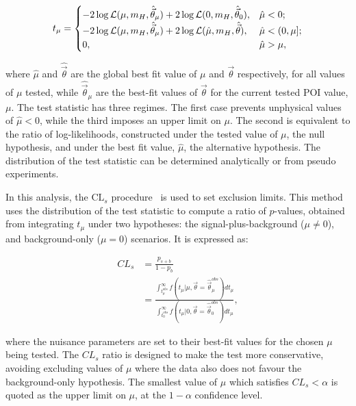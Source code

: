 \begin{equation}\label{eqn:hee_test_stat}
     t_{\mu} =
    \begin{cases}
      -2\log\mathcal{L}(\mu,m_{H},\hat{\vec{\theta}}_{\mu}) + 2\log\mathcal{L}(0,m_{H},\hat{\vec{\theta}}_{0}), & \hat{\mu}<0;\\
      -2\log\mathcal{L}(\mu,m_{H},\hat{\vec{\theta}}_{\mu}) + 2\log\mathcal{L}(\hat{\mu},m_{H},\hat{\vec{\theta}}), & \hat{\mu}<(0,\mu];\\
      0, & \hat{\mu}>\mu,\\
    \end{cases} 
\end{equation}


\noindent where $\hat{\mu}$ and $\hat{\vec{\theta}}$ are the global best fit value of $\mu$ and ${\vec{\theta}}$ respectively, for all values of $\mu$ tested, while $\hat{\vec{\theta}}_{\mu}$ are the best-fit values of $\vec{\theta}$ for the current tested POI value, $\mu$. The test statistic has three regimes. The first case prevents unphysical values of $\hat{\mu}<0$, while the third imposes an upper limit on $\mu$. The second is equivalent to the ratio of log-likelihoods, constructed under the tested value of $\mu$, the null hypothesis, and under the best fit value, $\hat{\mu}$, the alternative hypothesis. The distribution of the test statistic can be determined analytically or from pseudo experiments. %

In this analysis, the $\mathrm{CL}_s$ procedure~\cite{CLs1,CLs2,LHCStatProcedures} is used to set exclusion limits. This method uses the distribution of the test statistic to compute a ratio of $p$-values, obtained from integrating $t_{\mu}$ under two hypotheses: the signal-plus-background ($\mu\neq0$), and background-only ($\mu=0$) scenarios. It is expressed as: %

\begin{align*}
    CL_{s} &= \frac{p_{s+b}}{1-p_{b}}\\
           &= \frac{\int_{t_{\mu}^{obs}}^{\infty} f(t_{\mu}|\mu,\vec{\theta}=\hat{\vec{\theta}}_{\mu}^{obs})dt_{\mu}}{\int_{t_{0}^{obs}}^{\infty} f(t_{\mu}|0,\vec{\theta}=\hat{\vec{\theta}}_{0}^{obs})dt_{\mu}},
\end{align*}

\noindent where the nuisance parameters are set to their best-fit values for the chosen $\mu$ being tested. The $CL_{s}$ ratio is designed to make the test more conservative, avoiding excluding values of $\mu$ where the data also does not favour the background-only hypothesis. The smallest value of $\mu$ which satisfies $CL_{s}<\alpha$ is quoted as the upper limit on $\mu$, at the $1-\alpha$ confidence level. 

